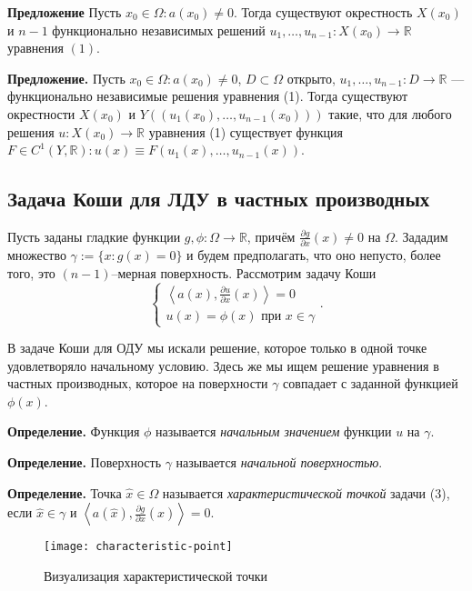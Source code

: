 \textbf{Предложение} Пусть $x_0 \in \Omega: a(x_0) \neq 0$. Тогда существуют окрестность $X(x_0)$ и $n-1$ функционально независимых решений $u_1, \dots, u_{n-1} \colon X(x_0) \to \mathbb{R}$ уравнения $(1)$. 

\textbf{Предложение.} Пусть $x_0 \in \Omega: a(x_0) \ne 0$, $D \subset \Omega$ открыто, $u_1, \dots, u_{n-1}\colon D \to \mathbb R$ --- функционально независимые решения уравнения (1).
Тогда существуют окрестности $X(x_0)$ и $Y((u_1(x_0), \dots, u_{n-1}(x_0)))$ такие, что для любого решения $u\colon X(x_0) \to \mathbb R$ уравнения (1) существует функция $F \in C^1(Y, \mathbb{R}) : u(x) \equiv F(u_1(x), \dots, u_{n-1}(x))$.

\subsection{Задача Коши для ЛДУ в частных производных}

Пусть заданы гладкие функции $g, \phi \colon \Omega \to \mathbb R$, причём $\frac{\partial g}{\partial x}(x) \ne 0$ на $\Omega$.
Зададим множество $\gamma := \{x: g(x) = 0\}$ и будем предполагать, что оно непусто, более того, это $(n-1)$--мерная поверхность.
Рассмотрим задачу Коши
\begin{equation}
    \begin{cases}
        \left<a(x), \frac{\partial u}{\partial x}(x) \right> = 0 \\
        u(x) = \phi(x) \text{ при $x \in \gamma$}
    \end{cases}.
\end{equation}

В задаче Коши для ОДУ мы искали решение, которое только в одной точке удовлетворяло начальному условию.
Здесь же мы ищем решение уравнения в частных производных, которое на поверхности $\gamma$ совпадает с заданной функцией $\phi(x)$.

\textbf{Определение.} Функция $\phi$ называется \textit{начальным значением} функции $u$ на $\gamma$.

\textbf{Определение.} Поверхность $\gamma$ называется \textit{начальной поверхностью}.

\textbf{Определение.} Точка $\widehat{x} \in \Omega$ называется \textit{характеристической точкой} задачи (3), если $\widehat{x} \in \gamma$ и $\left<a(\widehat{x}), \frac{\partial g}{\partial x}(\widehat{x}) \right> = 0$.

\begin{figure}[h]
    \texttt{[image: characteristic-point]}
    \centering
    \caption{Визуализация характеристической точки}
\end{figure}

